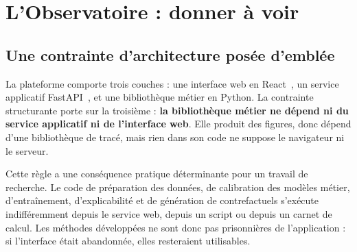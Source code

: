 \chapter{L'Observatoire : donner à voir}
\label{ch:observatoire}


\section{Une contrainte d'architecture posée d'emblée}

La plateforme comporte trois couches : une interface web en React~\cite{react}, un service
applicatif FastAPI~\cite{fastapi}, et une bibliothèque métier en Python. La contrainte structurante porte sur la troisième : \textbf{la
bibliothèque métier ne dépend ni du service applicatif ni de l'interface web}. Elle produit des
figures, donc dépend d'une bibliothèque de tracé, mais rien dans son code ne suppose le
navigateur ni le serveur.

Cette règle a une conséquence pratique déterminante pour un travail de recherche. Le code de
préparation des données, de calibration des modèles métier, d'entraînement, d'explicabilité et
de génération de contrefactuels s'exécute indifféremment depuis le service web, depuis un script
ou depuis un carnet de calcul. Les méthodes développées ne sont donc pas prisonnières de
l'application : si l'interface était abandonnée, elles resteraient utilisables.

